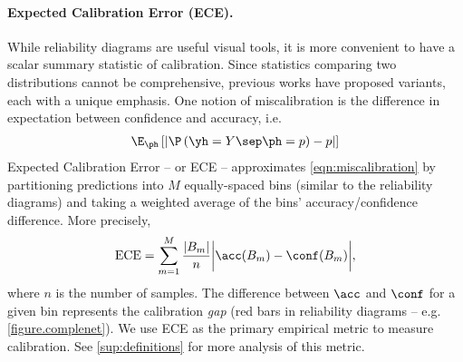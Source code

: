 \paragraph{Expected Calibration Error (ECE).}
While reliability diagrams are useful visual tools, it is more convenient to have a scalar summary statistic of calibration.
Since statistics comparing two distributions cannot be comprehensive, previous works have proposed variants, each with a unique emphasis.
One notion of miscalibration is the difference in expectation between confidence and accuracy, i.e.
%
\begin{align}
  \E_{\ph} \left[ \left| \P\left(\yh = Y \sep \ph = p\right) - p \right| \right]
  \label{eqn:miscalibration}
\end{align}
%
Expected Calibration Error \citep{naeini2015obtaining} -- or ECE -- approximates \eqref{eqn:miscalibration} by partitioning predictions into $M$ equally-spaced bins (similar to the reliability diagrams) and taking a weighted average of the bins' accuracy/confidence difference. More precisely,
\begin{equation}
\label{ece}
\text{ECE} = \sum_{m=1}^{M}\frac{|B_m|}{n}\bigg|\acc(B_m) - \conf(B_m)\bigg|,
\end{equation}
where $n$ is the number of samples.
The difference between $\acc$ and $\conf$ for a given bin represents the calibration \emph{gap} (red bars in reliability diagrams -- e.g. \autoref{figure.complenet}).
We use ECE as the primary empirical metric to measure calibration.
See \autoref{sup:definitions} for more analysis of this metric.


